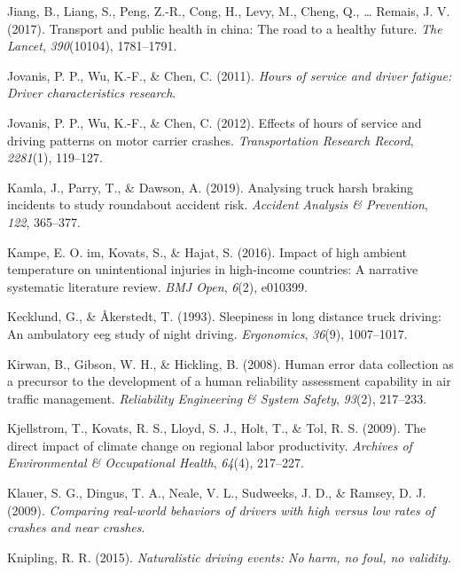 \documentclass[12pt]{book}
\numberwithin{equation}{chapter}
\begin{document}
\leavevmode\hypertarget{ref-jiang2017transport}{}%
Jiang, B., Liang, S., Peng, Z.-R., Cong, H., Levy, M., Cheng, Q., \ldots{} Remais, J. V. (2017). Transport and public health in china: The road to a healthy future. \emph{The Lancet}, \emph{390}(10104), 1781--1791.

\leavevmode\hypertarget{ref-jovanis2011hours}{}%
Jovanis, P. P., Wu, K.-F., \& Chen, C. (2011). \emph{Hours of service and driver fatigue: Driver characteristics research}.

\leavevmode\hypertarget{ref-jovanis2012effects}{}%
Jovanis, P. P., Wu, K.-F., \& Chen, C. (2012). Effects of hours of service and driving patterns on motor carrier crashes. \emph{Transportation Research Record}, \emph{2281}(1), 119--127.

\leavevmode\hypertarget{ref-kamla2019analysing}{}%
Kamla, J., Parry, T., \& Dawson, A. (2019). Analysing truck harsh braking incidents to study roundabout accident risk. \emph{Accident Analysis \& Prevention}, \emph{122}, 365--377.

\leavevmode\hypertarget{ref-im2016impact}{}%
Kampe, E. O. im, Kovats, S., \& Hajat, S. (2016). Impact of high ambient temperature on unintentional injuries in high-income countries: A narrative systematic literature review. \emph{BMJ Open}, \emph{6}(2), e010399.

\leavevmode\hypertarget{ref-kecklund1993sleepiness}{}%
Kecklund, G., \& Åkerstedt, T. (1993). Sleepiness in long distance truck driving: An ambulatory eeg study of night driving. \emph{Ergonomics}, \emph{36}(9), 1007--1017.

\leavevmode\hypertarget{ref-kirwan2008human}{}%
Kirwan, B., Gibson, W. H., \& Hickling, B. (2008). Human error data collection as a precursor to the development of a human reliability assessment capability in air traffic management. \emph{Reliability Engineering \& System Safety}, \emph{93}(2), 217--233.

\leavevmode\hypertarget{ref-kjellstrom2009direct}{}%
Kjellstrom, T., Kovats, R. S., Lloyd, S. J., Holt, T., \& Tol, R. S. (2009). The direct impact of climate change on regional labor productivity. \emph{Archives of Environmental \& Occupational Health}, \emph{64}(4), 217--227.

\leavevmode\hypertarget{ref-klauer2009comparing}{}%
Klauer, S. G., Dingus, T. A., Neale, V. L., Sudweeks, J. D., \& Ramsey, D. J. (2009). \emph{Comparing real-world behaviors of drivers with high versus low rates of crashes and near crashes}.

\leavevmode\hypertarget{ref-knipling2015naturalistic}{}%
Knipling, R. R. (2015). \emph{Naturalistic driving events: No harm, no foul, no validity}.
\end{document}
